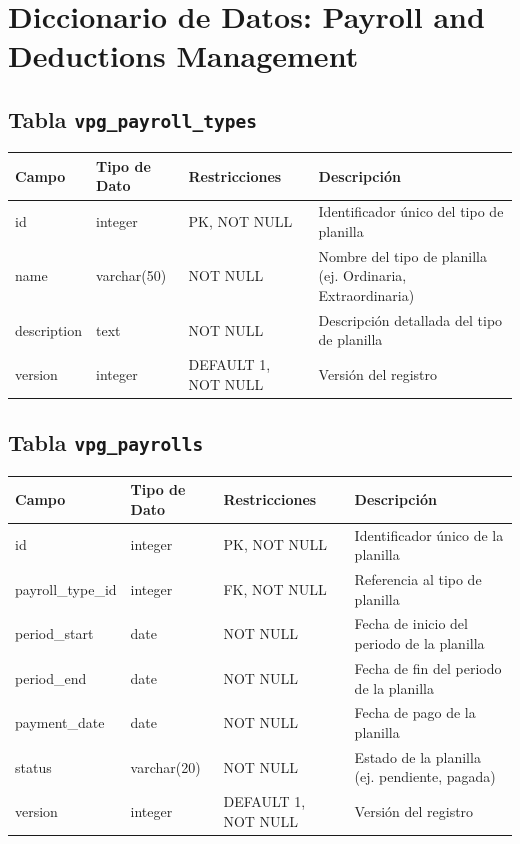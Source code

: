 \section{Diccionario de Datos: Payroll and Deductions Management}
\begin{center}
	\subsection{Tabla \texttt{vpg\_payroll\_types}}
	\small
	\begin{tabular}{|l|l|l|p{6cm}|}
		\hline
		\textbf{Campo} & \textbf{Tipo de Dato} & \textbf{Restricciones} & \textbf{Descripción}                                        \\
		\hline
		id             & integer               & PK, NOT NULL           & Identificador único del tipo de planilla                    \\
		name           & varchar(50)           & NOT NULL               & Nombre del tipo de planilla (ej. Ordinaria, Extraordinaria) \\
		description    & text                  & NOT NULL               & Descripción detallada del tipo de planilla                  \\
		version        & integer               & DEFAULT 1, NOT NULL    & Versión del registro                                        \\
		\hline
	\end{tabular}
	\normalsize

	\subsection{Tabla \texttt{vpg\_payrolls}}
	\small
	\begin{tabular}{|l|l|l|p{6cm}|}
		\hline
		\textbf{Campo}    & \textbf{Tipo de Dato} & \textbf{Restricciones} & \textbf{Descripción}                          \\
		\hline
		id                & integer               & PK, NOT NULL           & Identificador único de la planilla            \\
		payroll\_type\_id & integer               & FK, NOT NULL           & Referencia al tipo de planilla                \\
		period\_start     & date                  & NOT NULL               & Fecha de inicio del periodo de la planilla    \\
		period\_end       & date                  & NOT NULL               & Fecha de fin del periodo de la planilla       \\
		payment\_date     & date                  & NOT NULL               & Fecha de pago de la planilla                  \\
		status            & varchar(20)           & NOT NULL               & Estado de la planilla (ej. pendiente, pagada) \\
		version           & integer               & DEFAULT 1, NOT NULL    & Versión del registro                          \\
		\hline
	\end{tabular}
	\normalsize


\end{center}
